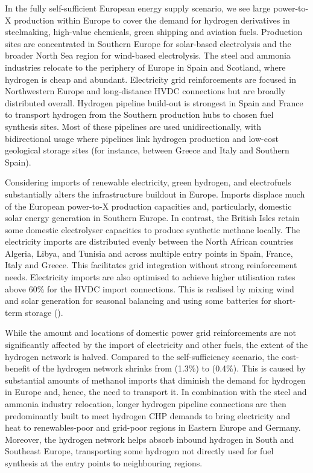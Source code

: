 In the fully self-sufficient European energy supply scenario, we see large
\mbox{power-to-X} production within Europe to cover the demand for hydrogen
derivatives in steelmaking, high-value chemicals, green shipping and aviation
fuels. Production sites are concentrated in Southern Europe for solar-based
electrolysis and the broader North Sea region for wind-based electrolysis. The
steel and ammonia industries relocate to the periphery of Europe in Spain and
Scotland, where hydrogen is cheap and abundant. Electricity grid reinforcements
are focused in Northwestern Europe and long-distance HVDC connections but are
broadly distributed overall. Hydrogen pipeline build-out is strongest in Spain
and France to transport hydrogen from the Southern production hubs to chosen
fuel synthesis sites. Most of these pipelines are used unidirectionally, with
bidirectional usage where pipelines link hydrogen production and low-cost
geological storage sites (for instance, between Greece and Italy and Southern
Spain).


Considering imports of renewable electricity, green hydrogen, and electrofuels substantially alters the infrastructure buildout in Europe. Imports displace much of the European power-to-X production capacities and, particularly, domestic solar energy generation in Southern Europe. In contrast, the British Isles retain some domestic electrolyser capacities to produce synthetic methane locally. The electricity imports are distributed evenly between the North African countries Algeria, Libya, and Tunisia and across multiple entry points in Spain, France, Italy and Greece. This facilitates grid integration without strong reinforcement needs. Electricity imports are also optimised to achieve higher utilisation rates above 60\% for the HVDC import connections. This is realised by mixing wind and solar generation for seasonal balancing and using some batteries for short-term storage ().

While the amount and locations of domestic power grid reinforcements are not significantly affected by the import of electricity and other fuels, the extent of the hydrogen network is halved. Compared to the self-sufficiency scenario, the cost-benefit of the hydrogen network shrinks from  (1.3\%) to  (0.4\%). This is caused by substantial amounts of methanol imports that diminish the demand for hydrogen in Europe and, hence, the need to transport it. In combination with the steel and ammonia industry relocation, longer hydrogen pipeline connections are then predominantly built to meet hydrogen CHP demands to bring electricity and heat to renewables-poor and grid-poor regions in Eastern Europe and Germany. Moreover, the hydrogen network helps absorb inbound hydrogen in South and Southeast Europe, transporting some hydrogen not directly used for fuel synthesis at the entry points to neighbouring regions. 

